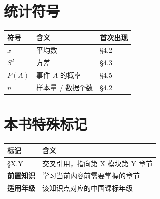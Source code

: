 \section*{统计符号}


\begin{center}
\begin{tabular}{lll}
\toprule
符号 & 含义 & 首次出现 \\
\midrule
$\bar{x}$ & 平均数 & §4.2 \\
$S^2$ & 方差 & §4.3 \\
$P(A)$ & 事件 $A$ 的概率 & §4.5 \\
$n$ & 样本量 / 数据个数 & §4.2 \\
\bottomrule
\end{tabular}
\end{center}


\section*{本书特殊标记}


\begin{center}
\begin{tabular}{ll}
\toprule
标记 & 含义 \\
\midrule
§X.Y & 交叉引用，指向第 X 模块第 Y 章节 \\
\textbf{前置知识} & 学习当前内容前需要掌握的章节 \\
\textbf{适用年级} & 该知识点对应的中国课标年级 \\
\bottomrule
\end{tabular}
\end{center}

